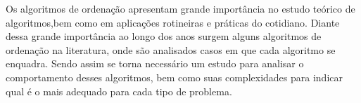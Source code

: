 \qquad Os algoritmos de ordenação apresentam grande importância no
estudo teórico de algoritmos,bem como em aplicações rotineiras e
práticas do cotidiano. Diante dessa grande importância ao longo dos
anos surgem alguns algoritmos de ordenação na literatura, onde são
analisados casos em que cada algoritmo se enquadra. Sendo assim se
torna necessário um estudo para analisar o comportamento desses
algoritmos, bem como suas complexidades para indicar qual é o mais
adequado para cada tipo de problema. 